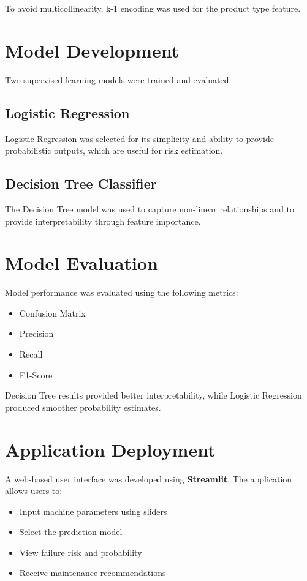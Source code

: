 \documentclass[12pt,a4paper]{article}
\begin{document}
To avoid multicollinearity, k-1 encoding was used for the product type feature.

\section{Model Development}
Two supervised learning models were trained and evaluated:

\subsection{Logistic Regression}
Logistic Regression was selected for its simplicity and ability to provide probabilistic outputs, which are useful for risk estimation.

\subsection{Decision Tree Classifier}
The Decision Tree model was used to capture non-linear relationships and to provide interpretability through feature importance.

\section{Model Evaluation}
Model performance was evaluated using the following metrics:

\begin{itemize}
    \item Confusion Matrix
    \item Precision
    \item Recall
    \item F1-Score
\end{itemize}

Decision Tree results provided better interpretability, while Logistic Regression produced smoother probability estimates.

\section{Application Deployment}
A web-based user interface was developed using \textbf{Streamlit}. The application allows users to:

\begin{itemize}
    \item Input machine parameters using sliders
    \item Select the prediction model
    \item View failure risk and probability
    \item Receive maintenance recommendations
\end{itemize}
\end{document}
